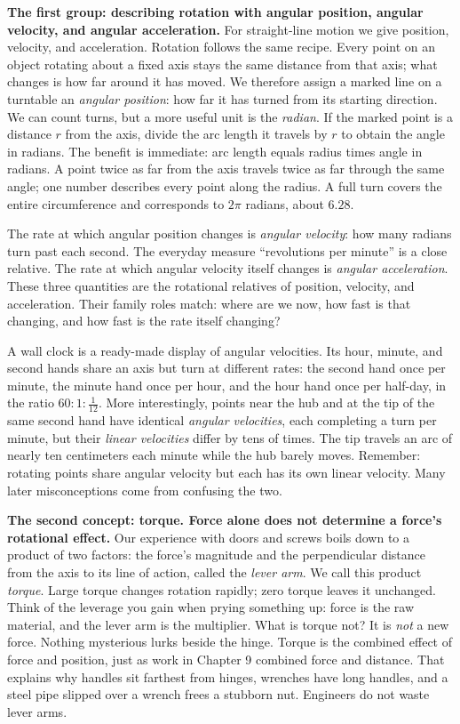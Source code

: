 
\begin{mainline}
\textbf{The first group: describing rotation with angular position, angular velocity, and angular acceleration.} For straight-line motion we give position, velocity, and acceleration. Rotation follows the same recipe. Every point on an object rotating about a fixed axis stays the same distance from that axis; what changes is how far around it has moved. We therefore assign a marked line on a turntable an \emph{angular position}: how far it has turned from its starting direction. We can count turns, but a more useful unit is the \emph{radian}. If the marked point is a distance \(r\) from the axis, divide the arc length it travels by \(r\) to obtain the angle in radians. The benefit is immediate: arc length equals radius times angle in radians. A point twice as far from the axis travels twice as far through the same angle; one number describes every point along the radius. A full turn covers the entire circumference and corresponds to \(2\pi\) radians, about \(6.28\).

The rate at which angular position changes is \emph{angular velocity}: how many radians turn past each second. The everyday measure ``revolutions per minute'' is a close relative. The rate at which angular velocity itself changes is \emph{angular acceleration}. These three quantities are the rotational relatives of position, velocity, and acceleration. Their family roles match: where are we now, how fast is that changing, and how fast is the rate itself changing?

A wall clock is a ready-made display of angular velocities. Its hour, minute, and second hands share an axis but turn at different rates: the second hand once per minute, the minute hand once per hour, and the hour hand once per half-day, in the ratio \(60:1:\tfrac1{12}\). More interestingly, points near the hub and at the tip of the same second hand have identical \emph{angular velocities}, each completing a turn per minute, but their \emph{linear velocities} differ by tens of times. The tip travels an arc of nearly ten centimeters each minute while the hub barely moves. Remember: rotating points share angular velocity but each has its own linear velocity. Many later misconceptions come from confusing the two.

\textbf{The second concept: torque. Force alone does not determine a force's rotational effect.} Our experience with doors and screws boils down to a product of two factors: the force's magnitude and the perpendicular distance from the axis to its line of action, called the \emph{lever arm}. We call this product \emph{torque}. Large torque changes rotation rapidly; zero torque leaves it unchanged. Think of the leverage you gain when prying something up: force is the raw material, and the lever arm is the multiplier. What is torque not? It is \emph{not} a new force. Nothing mysterious lurks beside the hinge. Torque is the combined effect of force and position, just as work in Chapter 9 combined force and distance. That explains why handles sit farthest from hinges, wrenches have long handles, and a steel pipe slipped over a wrench frees a stubborn nut. Engineers do not waste lever arms.


\end{mainline}
